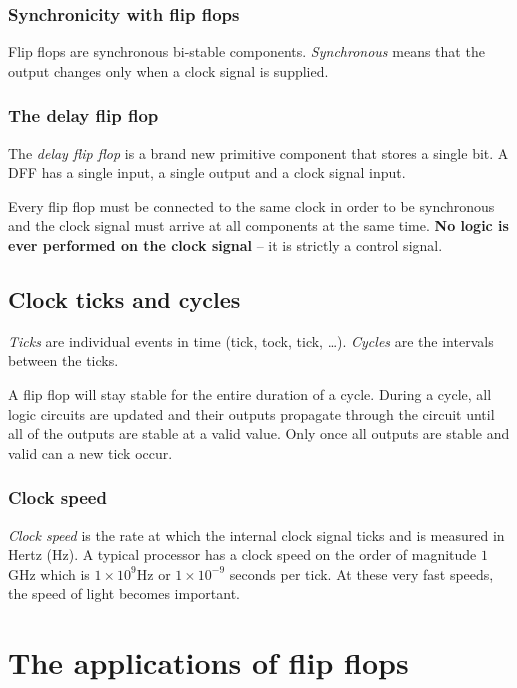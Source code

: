 \subsubsection{Synchronicity with flip flops}\label{ssub:synchronicity_with_flip_flops}

Flip flops are synchronous bi-stable components.
\emph{Synchronous} means that the output changes only when a clock signal is supplied.

\subsubsection{The delay flip flop}\label{ssub:the_delay_flip_flop}

The \emph{delay flip flop} is a brand new primitive component that stores a single bit.
A DFF has a single input, a single output and a clock signal input.

Every flip flop must be connected to the same clock in order to be synchronous and the clock signal must arrive at all components at the same time.
\textbf{No logic is ever performed on the clock signal} -- it is strictly a control signal.

\subsection{Clock ticks and cycles}\label{sub:clock_ticks_and_cycles}

\emph{Ticks} are individual events in time (tick, tock, tick, \ldots).
\emph{Cycles} are the intervals between the ticks.

A flip flop will stay stable for the entire duration of a cycle.
During a cycle, all logic circuits are updated and their outputs propagate through the circuit until all of the outputs are stable at a valid value.
Only once all outputs are stable and valid can a new tick occur.

\subsubsection{Clock speed}\label{ssub:clock_speed}

\emph{Clock speed} is the rate at which the internal clock signal ticks and is measured in Hertz (Hz).
A typical processor has a clock speed on the order of magnitude \(1\)GHz which is \(1\times 10^{9}\)Hz or \(1\times 10^{-9}\) seconds per tick.
At these very fast speeds, the speed of light becomes important.

\section{The applications of flip flops}\label{sec:the_applications_of_flip_flops}

